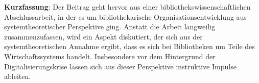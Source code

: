 \textbf{Kurzfassung}: Der Beitrag geht hervor aus einer
bibliothekswissenschaftlichen Abschlussarbeit, in der es um
bibliothekarische Organisationsentwicklung aus systemtheoretischer
Perspektive ging. Anstatt die Arbeit langweilig zusammenzufassen, wird
ein Aspekt diskutiert, der sich aus der systemtheoretischen Annahme
ergibt, dass es sich bei Bibliotheken um Teile des Wirtschaftssystems
handelt. Insbesondere vor dem Hintergrund der Digitalisierungskrise
lassen sich aus dieser Perspektive instruktive Impulse ableiten.
